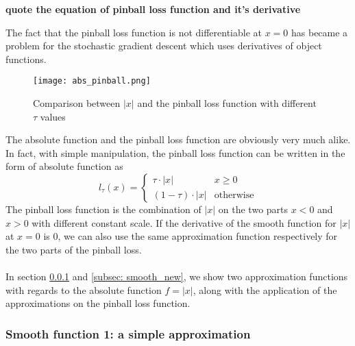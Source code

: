 \textbf{quote the equation of pinball loss function and it's derivative}

The fact that the pinball loss function is not differentiable at $x= 0$ has became a problem for the stochastic gradient descent which uses derivatives of object functions.

\begin{figure*}[h!]
	\texttt{[image: abs\_pinball.png]}
	\caption{Comparison between $|x|$ and the pinball loss function with different $\tau$ values}
\end{figure*}

The absolute function and the pinball loss function are obviously very much alike. In fact, with simple manipulation, the pinball loss function can be written in the form of absolute function as 
\begin{equation}
    l_\tau(x) = 
    \begin{cases}
        \tau \cdot |x| & {x \geq 0} \\
        (1-\tau) \cdot |x| & \text{otherwise}
    \end{cases}
\end{equation}
The pinball loss function is the combination of $|x|$ on the two parts $x<0$ and $x>0$ with different constant scale. 
If the derivative of the smooth function for $|x|$ at $x=0$ is $0$, we can also use the same approximation function respectively for the two parts of the pinball loss.
\\\\
In section \ref{subsec: smooth_sqrt} and \ref{subsec: smooth_new}, we show two approximation functions with regards to the absolute function $f = |x|$, along with the application of the approximations on the pinball loss function.

\subsubsection{Smooth function 1: a simple approximation}
\label{subsec: smooth_sqrt}

